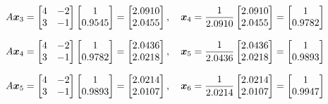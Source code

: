 \begin{solution}[3.6cm]
\smallskip \noindent
\(\displaystyle
A\boldsymbol{x}_3=\begin{bmatrix}4&-2\\3&-1\end{bmatrix}\begin{bmatrix}1\\0.9545\end{bmatrix}
=\begin{bmatrix}2.0910\\2.0455\end{bmatrix},
\quad \boldsymbol{x}_4 = \frac1{2.0910}\begin{bmatrix}2.0910\\2.0455\end{bmatrix} = \begin{bmatrix}1\\0.9782\end{bmatrix}\)

\smallskip \noindent
\(\displaystyle
A\boldsymbol{x}_4=\begin{bmatrix}4&-2\\3&-1\end{bmatrix}\begin{bmatrix}1\\0.9782\end{bmatrix}
=\begin{bmatrix}2.0436\\2.0218\end{bmatrix},
\quad \boldsymbol{x}_5 = \frac1{2.0436}\begin{bmatrix}2.0436\\2.0218\end{bmatrix} = \begin{bmatrix}1\\0.9893\end{bmatrix}\)

\smallskip \noindent
\(\displaystyle
A\boldsymbol{x}_5=\begin{bmatrix}4&-2\\3&-1\end{bmatrix}\begin{bmatrix}1\\0.9893\end{bmatrix}
=\begin{bmatrix}2.0214\\2.0107\end{bmatrix},
\quad \boldsymbol{x}_6 = \frac1{2.0214}\begin{bmatrix}2.0214\\2.0107\end{bmatrix} = \begin{bmatrix}1\\0.9947\end{bmatrix}\)


\end{solution}
